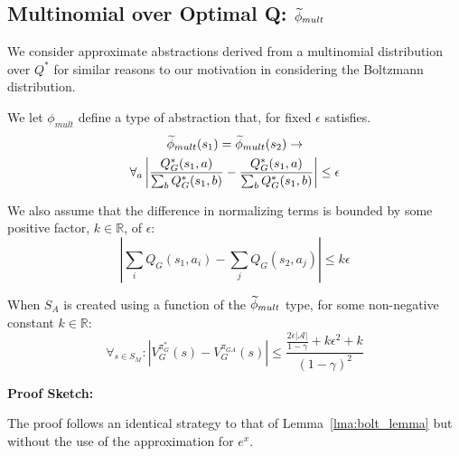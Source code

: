 \subsection{Multinomial over Optimal Q: $\widetilde \phi_{mult}$}
\label{sec:mult}

We consider approximate abstractions derived from a multinomial distribution over $Q^*$ for similar reasons to our motivation in considering the Boltzmann distribution.

We let $\phi_{mult}$ define a type of abstraction that, for fixed $\epsilon$ satisfies.
\begin{multline}
\widetilde \phi_{mult}(s_1) = \widetilde \phi_{mult}(s_2) \rightarrow \\
\forall_{a} \left|\frac{Q_G^*(s_1,a)}{\sum_b Q_G^*(s_1,b)} - \frac{Q_G^*(s_1,a)}{\sum_b Q_G^*(s_1,b)}\right| \leq \epsilon
\end{multline}
\edefn

We also assume that the difference in normalizing terms is bounded by some positive factor, $k \in \mathbb{R}$, of $\epsilon$:
\begin{equation}
\left |\sum_i Q_G(s_1,a_i) - \sum_j Q_G(s_2,a_j) \right | \leq k\epsilon
\end{equation}

\begin{lma} When $S_A$ is created using a function of the $\widetilde \phi_{mult}$ type, for some non-negative constant $k \in \mathbb{R}$:
\begin{equation}
\forall_{s \in S_M} : | V_G^{\pi^*_G}(s) - V_G^{\pi_{GA}}(s) | \leq \frac{\frac{2\epsilon|\mathcal{A}|}{1-\gamma} + k \epsilon^2 + k}{(1-\gamma)^2}
\end{equation}
\end{lma}

{\bf Proof Sketch:}

The proof follows an identical strategy to that of Lemma~\ref{lma:bolt_lemma} but without the use of the approximation for $e^x$.



